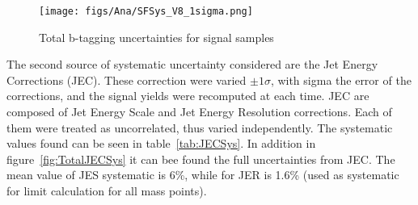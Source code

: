 \begin{figure}[!Hhtbp]
  \begin{center}
    \texttt{[image: figs/Ana/SFSys\_V8\_1sigma.png]}
    \caption{Total b-tagging uncertainties for signal samples}
    \label{fig:TotalSFSys}
  \end{center}
\end{figure}

The second source of systematic uncertainty considered are the Jet Energy Corrections (JEC). These correction were varied $\pm 1\sigma$, with sigma the error of the corrections, and the signal yields were recomputed at each time. JEC are composed of Jet Energy Scale and Jet Energy Resolution corrections. Each of them were treated as uncorrelated, thus varied independently. The systematic values found can be seen in table~\ref{tab:JECSys}. In addition in figure~\ref{fig:TotalJECSys} it can bee found the full uncertainties from JEC. The mean value of JES systematic is 6\%, while for JER is 1.6\% (used as systematic for limit calculation for all mass points).

\begin{table*}[htbH]
\begin{center}
\caption{JEC uncertainties for signal samples\label{tab:JECSys}}
\end{center}
\end{table*}

